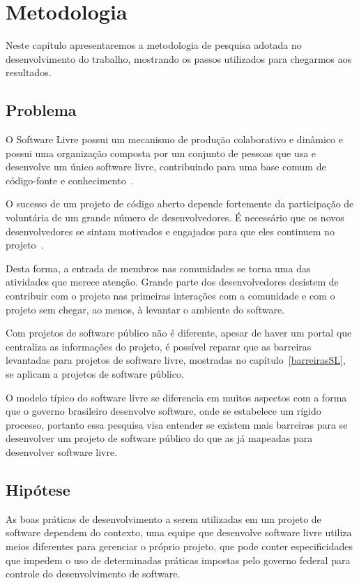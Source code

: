 \chapter{Metodologia}
\label{sec:metodologia}

Neste capítulo apresentaremos a metodologia de pesquisa adotada no desenvolvimento 
do trabalho, mostrando os passos utilizados para chegarmos aos resultados.


\section{Problema}

O Software Livre possui um mecanismo de produção colaborativo e dinâmico 
e possui uma organização composta por um conjunto de pessoas que usa e desenvolve 
um único software livre, contribuindo para uma base comum de código-fonte e 
conhecimento~\cite{reis2003caracterizacc}.

O sucesso de um projeto de código aberto depende fortemente da participação de 
voluntária de um grande número de desenvolvedores. É necessário que os novos 
desenvolvedores se sintam motivados e engajados para que eles continuem no 
projeto~\cite{qureshi2010socialization}.

Desta forma, a entrada de membros nas comunidades se torna uma das atividades que
merece atenção. Grande parte dos desenvolvedores desistem de contribuir com o 
projeto nas primeiras interações com a comunidade e com o projeto sem chegar,
ao menos, à levantar o ambiente do software.

Com projetos de software público não é diferente, apesar de haver um portal que
centraliza as informações do projeto, é possível reparar que as barreiras levantadas
para projetos de software livre, mostradas no capítulo~\ref{barreirasSL}, se aplicam
a projetos de software público.

O modelo típico do software livre se diferencia em muitos aspectos 
com a forma que o governo brasileiro desenvolve software, onde se estabelece um 
rígido processo, portanto essa pesquisa visa entender se existem mais barreiras 
para se desenvolver um projeto de software público do que as já mapeadas para 
desenvolver software livre.



\section{Hipótese}

As boas práticas de desenvolvimento a serem utilizadas em um projeto de software 
dependem do contexto, uma equipe que desenvolve software livre utiliza
meios diferentes para gerenciar o próprio projeto, que pode conter especificidades 
que impedem o uso de determinadas práticas impostas pelo governo federal para controle
do desenvolvimento de software. 


